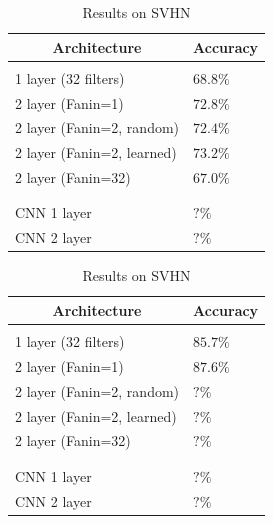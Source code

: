 \documentclass{article} %
\begin{document}
\begin {table}
\parbox{.5\linewidth}{
\caption{Results on CIFAR-10}
\label{resuts-cifar10}
\begin{center}
\begin{tabular}{ll}
\multicolumn{1}{c}{\bf Architecture}  &\multicolumn{1}{c}{\bf Accuracy}
\\ \hline \\
1 layer (32 filters)                            & $68.8\%$\\
2 layer (Fanin=1)                            &$72.8\%$ \\
2 layer (Fanin=2, random)            &$72.4\%$ \\
2 layer (Fanin=2, learned)            &$73.2\%$\\
2 layer (Fanin=32)                          &$67.0\%$\\
\\ \hline \\
CNN 1 layer                                    &$?\%$\\
CNN 2 layer                                    &$?\%$\\
\end{tabular}
\end{center}
}
\parbox{.5\linewidth}{
\caption{Results on SVHN}
\label{resuts-svhn}
\begin{center}
\begin{tabular}{ll}
\multicolumn{1}{c}{\bf Architecture}  &\multicolumn{1}{c}{\bf Accuracy}
\\ \hline \\
1 layer (32 filters)                          & $85.7\%$\\
2 layer (Fanin=1)                           &$87.6\%$ \\
2 layer (Fanin=2, random)           &$?\%$ \\
2 layer (Fanin=2, learned)           &$?\%$\\
2 layer (Fanin=32)                        &$?\%$\\
\\ \hline \\
CNN 1 layer                                   &$?\%$\\
CNN 2 layer                                   &$?\%$\\
\end{tabular}
\end{center}
}
\end{table}
\end{document}
